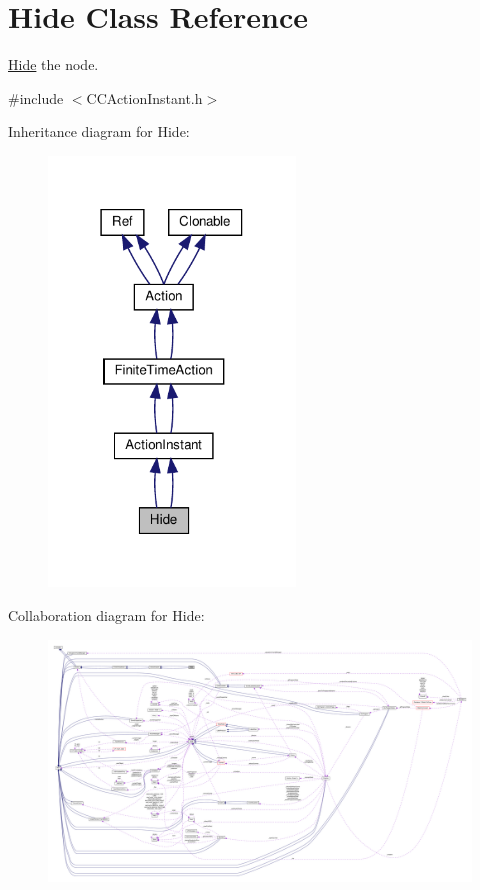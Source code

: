 \hypertarget{classHide}{}\section{Hide Class Reference}
\label{classHide}


\hyperlink{classHide}{Hide} the node.  




{\ttfamily \#include $<$C\+C\+Action\+Instant.\+h$>$}



Inheritance diagram for Hide\+:
\nopagebreak
\begin{figure}[H]
\begin{center}
\leavevmode
\includegraphics[width=186pt]{classHide__inherit__graph}
\end{center}
\end{figure}


Collaboration diagram for Hide\+:
\nopagebreak
\begin{figure}[H]
\begin{center}
\leavevmode
\includegraphics[width=350pt]{classHide__coll__graph}
\end{center}
\end{figure}
